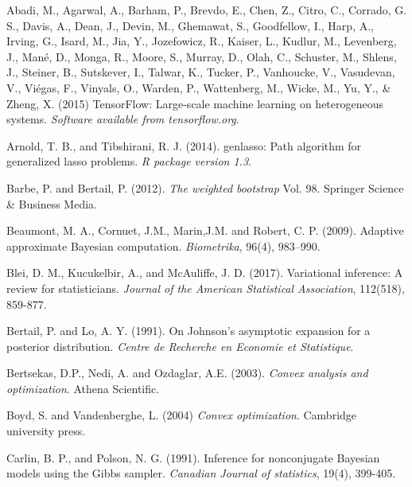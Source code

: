 \documentclass[12pt]{TD-CJS}
\begin{document}
\begin{thebibliography}{}

Abadi, M., Agarwal, A., Barham, P., Brevdo, E., Chen, Z., Citro, C., Corrado, G. S., Davis, A., Dean, J., Devin, M., Ghemawat, S., Goodfellow, I., Harp, A., Irving, G., Isard, M., Jia, Y., Jozefowicz, R., Kaiser, L., Kudlur, M., Levenberg, J., Man\'{e}, D., Monga, R., Moore, S., Murray, D., Olah, C., Schuster, M., Shlens, J., Steiner, B., Sutskever, I., Talwar, K., Tucker, P., Vanhoucke, V., Vasudevan, V., Vi\'{e}gas, F., Vinyals, O., Warden, P., Wattenberg, M., Wicke, M., Yu, Y., \& Zheng, X. (2015) TensorFlow: Large-scale machine learning on heterogeneous systems. {\it Software available from tensorflow.org}.

Arnold, T. B., and Tibshirani, R. J. (2014). genlasso: Path algorithm for generalized lasso problems. {\it R package version 1.3}.

Barbe, P. and Bertail, P. (2012). {\em The weighted bootstrap} Vol. 98. Springer Science \& Business Media.

Beaumont, M. A.,  Cornuet, J.M.,  Marin,J.M. and Robert, C. P. (2009). Adaptive approximate Bayesian computation. {\it Biometrika}, 96(4), 983--990.

Blei, D. M., Kucukelbir, A., and  McAuliffe, J. D. (2017). Variational inference: A review for statisticians. {\it Journal of the American Statistical Association}, 112(518), 859-877.

Bertail, P. and Lo,  A. Y.  (1991). On Johnson's asymptotic expansion for a posterior distribution. {\it Centre de Recherche en Economie et Statistique}.

Bertsekas, D.P., Nedi, A. and Ozdaglar, A.E. (2003). {\em Convex analysis and optimization}. Athena Scientific.

Boyd, S. and Vandenberghe, L. (2004) {\it Convex optimization}. Cambridge university press.

Carlin, B. P., and Polson, N. G. (1991). Inference for nonconjugate Bayesian models using the Gibbs sampler. {\it Canadian Journal of statistics}, 19(4), 399-405.


\end{thebibliography}
\end{document}
